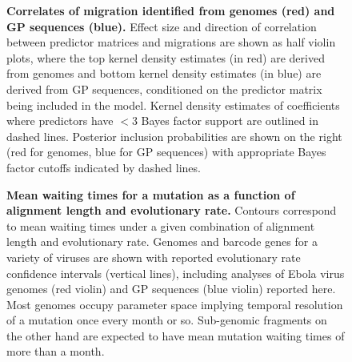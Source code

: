 \documentclass{bmcart}
\def\texttt{[image: ]}
\begin{document}
\begin{backmatter}
\begin{figure}[ht]
 \centering
	\caption{\textbf{Correlates of migration identified from genomes (red) and GP sequences (blue).}
  Effect size and direction of correlation between predictor matrices and migrations are shown as half violin plots, where the top kernel density estimates (in red) are derived from genomes and bottom kernel density estimates (in blue) are derived from GP sequences, conditioned on the predictor matrix being included in the model.
  Kernel density estimates of coefficients where predictors have $<$3 Bayes factor support are outlined in dashed lines.
  Posterior inclusion probabilities are shown on the right (red for genomes, blue for GP sequences) with appropriate Bayes factor cutoffs indicated by dashed lines.
	}
	\label{glm}
\end{figure}



\begin{figure}[h]
 \centering
	\caption{\textbf{Mean waiting times for a mutation as a function of alignment length and evolutionary rate.}
  Contours correspond to mean waiting times under a given combination of alignment length and evolutionary rate.
  Genomes and barcode genes for a variety of viruses are shown with reported evolutionary rate confidence intervals (vertical lines), including analyses of Ebola virus genomes (red violin) and GP sequences (blue violin) reported here.
  Most genomes occupy parameter space implying temporal resolution of a mutation once every month or so.
  Sub-genomic fragments on the other hand are expected to have mean mutation waiting times of more than a month.
	}
	\label{contours}
\end{figure}


%
%



\end{backmatter}
\end{document}
